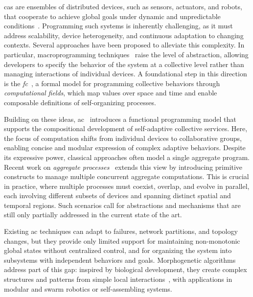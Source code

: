 \documentclass[runningheads]{llncs}
\begin{document}
    \ac{cas} are ensembles of distributed devices, such as sensors, actuators, and robots,
    that cooperate to achieve global goals under dynamic and unpredictable conditions~\cite{DBLP:conf/huc/Ferscha15}.
%
    Programming such systems is inherently challenging,
    as it must address scalability, device heterogeneity,
    and continuous adaptation to changing contexts.
%
    Several approaches have been proposed to alleviate this complexity.
%
    In particular,
    macroprogramming techniques~\cite{casadei22} raise the level of abstraction,
    allowing developers to specify the behavior of the system at a collective level
    rather than managing interactions of individual devices.
%
    A foundational step in this direction is the \emph{\ac{fc}}~\cite{JLAMP2019,TOCL2019},
    a formal model for programming collective behaviors through \emph{computational fields},
    which map values over space and time and enable composable definitions of self-organizing processes.

    Building on these ideas,
    \ac{ac}~\cite{BPV15} introduces a functional programming model that supports the compositional development of self-adaptive collective services.
    Here,
    the focus of computation shifts from individual devices to collaborative groups,
    enabling concise and modular expression of complex adaptive behaviors.
    Despite its expressive power, classical approaches often model a single aggregate program.
    Recent work on \emph{aggregate processes}~\cite{Coordination2019-processes}
    extends this view by introducing primitive constructs to manage multiple concurrent aggregate computations.
    This is crucial in practice,
    where multiple processes must coexist, overlap, and evolve in parallel,
    each involving different subsets of devices and spanning distinct spatial and temporal regions.
    Such scenarios call for abstractions and mechanisms that are still only partially addressed in the current state of the art.

    Existing \ac{ac} techniques can adapt to failures, network partitions, and topology changes,
    but they provide only limited support for maintaining non-monotonic global states without centralized control,
    and for organizing the system into subsystems with independent behaviors and goals.
    Morphogenetic algorithms address part of this gap:
    inspired by biological development,
    they create complex structures and patterns from simple local interactions~\cite{DBLP:books/daglib/p/Beal12,DBLP:conf/gecco/MorganC13,DBLP:conf/gecco/ZahadatHS17},
    with applications in modular and swarm robotics or self-assembling systems.
\end{document}
